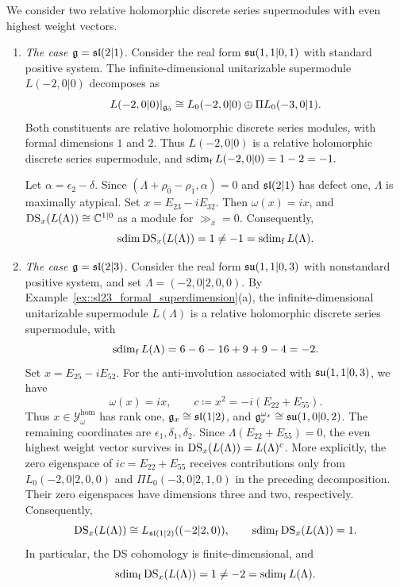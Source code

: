 \begin{example}
We consider two relative holomorphic discrete series supermodules with even highest weight vectors.

\begin{enumerate}
\item[(a)] \emph{The case $\gg=\sl(2\vert1)$.}
Consider the real form $\su(1,1\vert0,1)$ with standard positive system. The infinite-dimensional unitarizable supermodule $L(-2,0\vert0)$ decomposes as
\begin{equation*}
L(-2,0\vert0)|_{\even}
\cong
L_0(-2,0\vert0)\oplus\Pi L_0(-3,0\vert1).
\end{equation*}
Both constituents are relative holomorphic discrete series modules, with formal dimensions $1$ and $2$. Thus $L(-2,0\vert0)$ is a relative holomorphic discrete series supermodule, and
$
\fsdim L(-2,0\vert0)=1-2=-1.
$

Let $\alpha=\epsilon_2-\delta$. Since
$
(\Lambda+\rho_{\bar0}-\rho_{\bar1},\alpha)=0
$
and $\sl(2\vert1)$ has defect one, $\Lambda$ is maximally atypical. Set
$
x=E_{23}-iE_{32}.
$
Then $\omega(x)=ix$, and
$
\DS_x(L(\Lambda))\cong\mathbb C^{1\vert0}
$
as a module for $\gg_x=0$. Consequently,
\begin{equation*}
\sdim\DS_x(L(\Lambda))=1\neq-1=\fsdim L(\Lambda).
\end{equation*}

\item[(b)] \emph{The case $\gg=\sl(2\vert3)$.}
Consider the real form $\su(1,1\vert0,3)$ with nonstandard positive
system, and set $\Lambda=(-2,0\vert2,0,0)$.
By Example~\ref{ex::sl23_formal_superdimension}(a), the
infinite-dimensional unitarizable supermodule $L(\Lambda)$ is a
relative holomorphic discrete series supermodule, with
\[
\fsdim L(\Lambda)=6-6-16+9+9-4=-2.
\]
Set $x=E_{25}-iE_{52}$. For the anti-involution associated with
$\su(1,1\vert0,3)$, we have
\[
\omega(x)=ix,\qquad c\coloneqq x^2=-i(E_{22}+E_{55}).
\]
Thus $x\in\mathcal{Y}^{\mathrm{hom}}_{\omega}$ has rank one, $\gg_x\cong\sl(1\vert2)$, and $\gg_x^{\omega_x}\cong\su(1,0\vert0,2)$. The remaining coordinates are $\epsilon_1,\delta_1,\delta_2$.
Since $\Lambda(E_{22}+E_{55})=0$, the even highest weight vector
survives in $\DS_x(L(\Lambda))=L(\Lambda)^c$.
More explicitly, the zero eigenspace of $ic=E_{22}+E_{55}$ receives
contributions only from $L_0(-2,0\vert2,0,0)$ and
$\Pi L_0(-3,0\vert2,1,0)$ in the preceding decomposition.
Their zero eigenspaces have dimensions three and two, respectively.
Consequently,
\[
\DS_x(L(\Lambda))
\cong L_{\sl(1\vert2)}((-2\vert2,0)),\qquad
\fsdim\DS_x(L(\Lambda))=1.
\]
In particular, the DS cohomology is finite-dimensional, and 
\[
\fsdim\DS_x(L(\Lambda))=1\neq-2=\fsdim L(\Lambda).
\]
\end{enumerate}
\end{example}


